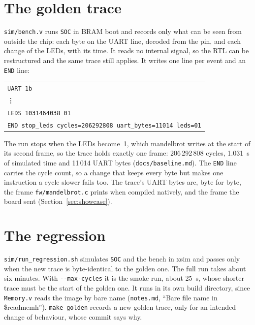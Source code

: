 \documentclass[11pt,a4paper]{report}
\newcommand{\notes}[1]{(\texttt{notes.md}, ``#1'')}
\begin{document}
\section{The golden trace}
\label{sec:golden}

\texttt{sim/bench.v} runs \texttt{SOC} in BRAM boot and records only what can be seen from
outside the chip: each byte on the UART line, decoded from the pin, and each change of the
LEDs, with its time. It reads no internal signal, so the RTL can be restructured and the
same trace still applies. It writes one line per event and an \texttt{END} line:

\begin{center}
  \small
  \begin{tabular}{@{}l@{}}
    \texttt{UART 1b} \\
    \quad\vdots \\
    \texttt{LEDS 1031464038 01} \\
    \texttt{END stop\_leds cycles=206292808 uart\_bytes=11014 leds=01} \\
  \end{tabular}
\end{center}

The run stops when the LEDs become~1, which mandelbrot writes at the start of its second
frame, so the trace holds exactly one frame: 206\,292\,808 cycles, 1.031~s of simulated
time and 11\,014 UART bytes (\texttt{docs/baseline.md}). The \texttt{END} line carries the
cycle count, so a change that keeps every byte but makes one instruction a cycle slower
fails too. The trace's UART bytes are, byte for byte, the frame \texttt{fw/mandelbrot.c}
prints when compiled natively, and the frame the board sent (Section~\ref{sec:showcase}).

\section{The regression}

\texttt{sim/run\_regression.sh} simulates \texttt{SOC} and the bench in xsim and passes only
when the new trace is byte-identical to the golden one. The full run takes about six minutes.
With \texttt{-{}-max-cycles} it is the smoke run, about 25~s, whose shorter trace must be the
start of the golden one. It runs in its own build directory, since \texttt{Memory.v} reads
the image by bare name \notes{Bare file name in \$readmemh}. \texttt{make golden} records a new
golden trace, only for an intended change of behaviour, whose commit says why.
\end{document}
